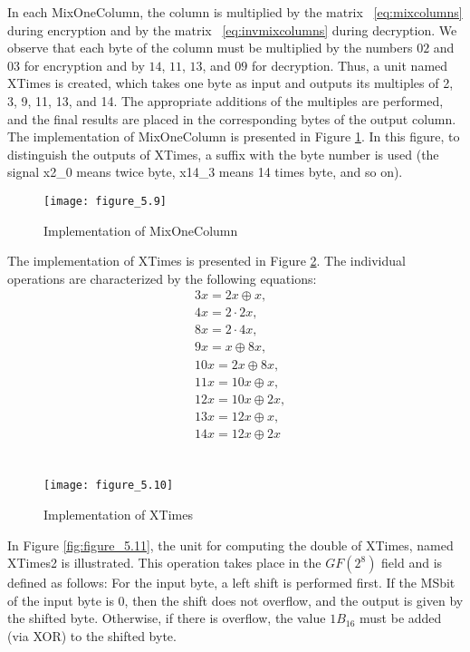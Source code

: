 In each MixOneColumn, the column is multiplied by the matrix ~\ref{eq:mixcolumns} during encryption and by the matrix ~\ref{eq:invmixcolumns} during decryption. We observe that each byte of the column must be multiplied by the numbers $02$ and $03$ for encryption and by $14$, $11$, $13$, and $09$ for decryption. Thus, a unit named XTimes is created, which takes one byte as input and outputs its multiples of 2, 3, 9, 11, 13, and 14. The appropriate additions of the multiples are performed, and the final results are placed in the corresponding bytes of the output column. The implementation of MixOneColumn is presented in Figure \ref{fig:figure_5.9}. In this figure, to distinguish the outputs of XTimes, a suffix with the byte number is used (the signal x2\_0 means twice byte, x14\_3 means 14 times byte, and so on).

\begin{figure}[H]
\centering
\texttt{[image: figure\_5.9]}\\
\caption{ Implementation of MixOneColumn}
\label{fig:figure_5.9}
\end{figure}

The implementation of XTimes is presented in Figure \ref{fig:figure_5.10}. The individual operations are characterized by the following equations: \\

\begin{equation}
\begin{split}
&3x=2x\oplus x,\\
&4x=2\cdot 2x,\\
&8x=2\cdot 4x,\\
&9x=x\oplus8x,\\
&10x=2x\oplus 8x,\\
&11x=10x\oplus x,\\
&12x=10x\oplus 2x,\\
&13x=12x\oplus x,\\
&14x=12x\oplus2x \\
\end{split}
\end{equation}\\

\begin{figure}
\centering
\texttt{[image: figure\_5.10]}\\
\caption{ Implementation of XTimes }
\label{fig:figure_5.10}
\end{figure}


In Figure \ref{fig:figure_5.11}, the unit for computing the double of XTimes, named XTimes2 is illustrated. This operation takes place in the $GF(2^8)$ field and is defined as follows: For the input byte, a left shift is performed first. If the MSbit of the input byte is 0, then the shift does not overflow, and the output is given by the shifted byte. Otherwise, if there is overflow, the value $1B_{16}$ must be added (via XOR) to the shifted byte.

